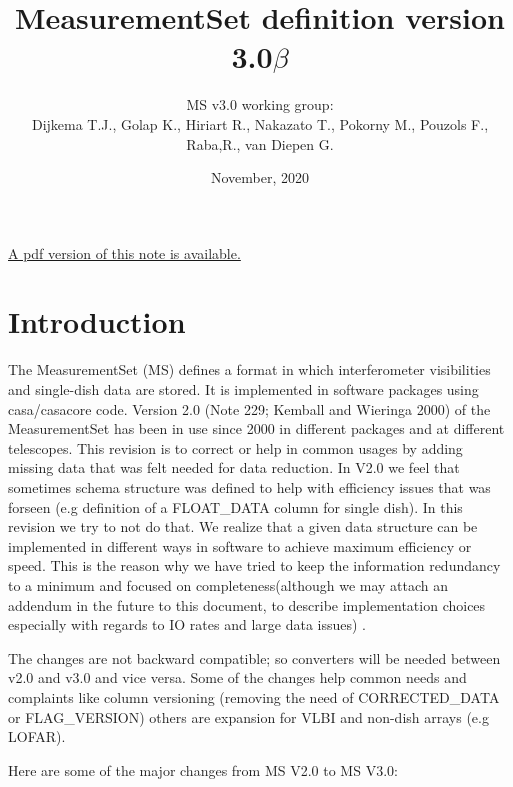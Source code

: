\documentclass{article}
\begin{document}
\title{MeasurementSet definition version 3.0$\beta$}

\author{ MS v3.0 working group:\\
  Dijkema T.J., Golap K., Hiriart R., Nakazato T., Pokorny M., Pouzols F., Raba,R., van Diepen G.
}
\date{November, 2020}
\maketitle

\ifpdf
\else
\href{264.pdf}{A pdf version of this note is available.}
\fi

\tableofcontents



\section{Introduction}

The MeasurementSet (MS) defines a format in which interferometer
visibilities and single-dish data are stored. It is implemented in
software packages using casa/casacore code. Version 2.0 (Note 229;
Kemball and Wieringa 2000) of the MeasurementSet has been in use since 2000 in
different packages and at different telescopes. This revision is to
correct or help in common usages by adding missing data that was felt
needed for data reduction. In V2.0 we feel that sometimes schema
structure was defined to help with efficiency issues that was forseen
(e.g definition of a FLOAT\_DATA column for single dish).  In this
revision we try to not do that. We realize that a given data structure
can be implemented in different ways in software to achieve maximum
efficiency or speed. This is the reason why we have tried to keep the
information redundancy to a minimum and focused on
completeness(although we may attach an addendum in the future to this
document, to describe implementation choices especially with regards
to IO rates and large data issues) .

The changes are not backward compatible; so converters will be needed
between v2.0 and v3.0 and vice versa. Some of the changes help
common needs and complaints like column versioning (removing the need
of CORRECTED\_DATA or FLAG\_VERSION) others are expansion for VLBI and
non-dish arrays (e.g LOFAR).



Here are some of the major changes from MS V2.0 to MS V3.0:
\end{document}
